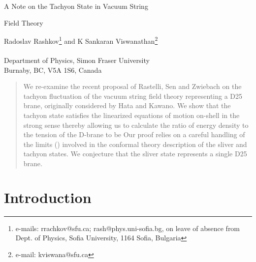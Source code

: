 \documentclass[a4paper,12pt]{article}
\begin{document}
\vspace*{1cm}

\begin{center}
{\bf{\Large A Note on the Tachyon State in Vacuum String \\
\vspace*{.35cm}

Field Theory }}

\vspace*{1cm}

Radoslav Rashkov\footnote{e-mails: rrachkov@sfu.ca; rash@phys.uni-sofia.bg,
on leave of absence from Dept. of Physics, Sofia University, 1164 Sofia,
Bulgaria}
and K Sankaran Viswanathan\footnote{e-mail: kviswana@sfu.ca}\\

\ \\
Department of Physics, Simon Fraser University \\
Burnaby, BC, V5A 1S6, Canada
\end{center}


\vspace*{.8cm}

\begin{abstract}
We re-examine the recent proposal of Rastelli, Sen and Zwiebach on the tachyon
fluctuation of the vacuum string field theory representing a D25 brane,
originally considered by Hata and Kawano. We show that the tachyon state
satisfies the linearized equations of motion on-shell in the strong sense
thereby allowing us to calculate the ratio
\coordHE{}
of energy density to the tension of the D-brane to be
\coordHE{}
Our proof relies on a careful handling of the limits (\coordHE{}) involved in
the conformal theory description of the sliver and tachyon states.
We conjecture that the sliver state represents a single D25 brane.
\end{abstract}

\vspace*{.8cm}

\section{Introduction}
\end{document}
